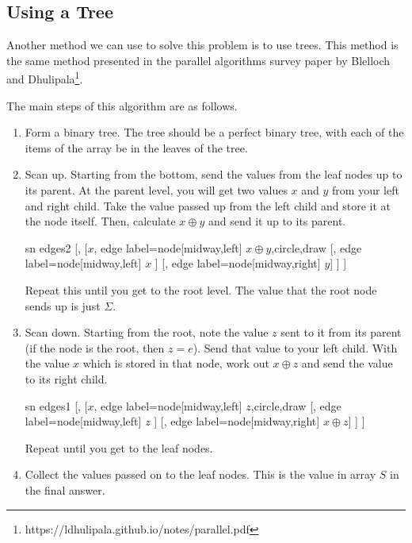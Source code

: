 \documentclass[12pt]{article}
\begin{document}
\subsection{Using a Tree}

Another method we can use to solve this problem is to use trees. This method is the same method presented in the parallel algorithms survey paper by Blelloch and Dhulipala\footnote{https://ldhulipala.github.io/notes/parallel.pdf}.

The main steps of this algorithm are as follows.
\begin{enumerate}
	\item Form a binary tree. The tree should be a perfect binary tree, with each of the items of the array be in the leaves of the tree.
	\item Scan up. Starting from the bottom, send the values from the leaf nodes up to its parent. At the parent level, you will get two values $x$ and $y$ from your left and right child. Take the value passed up from the left child and store it at the node itself. Then, calculate $x \oplus y$ and send it up to its parent.  
	\begin{center}
		\begin{forest}
			sn edges2
			[{}, 
				[$x$, edge label={node[midway,left] {$x\oplus y$}},circle,draw
					[{}, edge label={node[midway,left] {$x$}} ] 
					[{}, edge label={node[midway,right] {$y$}}] 
				]
			]
		\end{forest}
	\end{center}
	Repeat this until you get to the root level. The value that the root node sends up is just $\Sigma$.
	\item Scan down. Starting from the root, note the value $z$ sent to it from its parent (if the node is the root, then $z=e$). Send that value to your left child. With the value $x$ which is stored in that node, work out $x \oplus z$ and send the value to its right child.
	\begin{center}
		\begin{forest} 
			sn edges1
			[{}, 
			[$x$, edge label={node[midway,left] {$z$}},circle,draw
			[{}, edge label={node[midway,left] {$z$}} ] 
			[{}, edge label={node[midway,right] {$x\oplus z$}}] 
			]
			]
		\end{forest}
	\end{center}
	Repeat until you get to the leaf nodes.
	\item Collect the values passed on to the leaf nodes. This is the value in array $S$ in the final answer. 
\end{enumerate}
\end{document}

